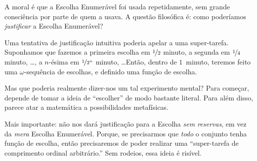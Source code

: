 \documentclass[../../../include/open-logic-section]{subfiles}
\begin{document}
A moral é que a Escolha Enumerável foi usada repetidamente, sem grande
consciência por parte de quem a usava. A questão filosófica é: como poderíamos
\emph{justificar} a Escolha Enumerável? 

Uma tentativa de justificação intuitiva poderia apelar a uma
super-tarefa. Suponhamos que fazemos a primeira escolha em $\nicefrac{1}{2}$ minuto, a segunda em $\nicefrac{1}{4}$ minuto, \dots, a
$n$-ésima em $\nicefrac{1}{2^n}$ minuto, \dots\@ Então, dentro de $1$~minuto, teremos feito uma $\omega$-sequência de escolhas, e definido
uma função de escolha. 

Mas que poderia realmente dizer-nos um tal experimento mental? Para
começar, depende de tomar a ideia de ``escolher'' de modo bastante
literal. Para além disso, parece atar a matemática a possibilidades metafísicas.

Mais importante: não nos dará justificação para a Escolha \emph{sem reservas}, em vez da \emph{mera} Escolha Enumerável.
Porque, se precisarmos que \emph{todo} o conjunto tenha função de escolha, então precisaremos de poder realizar uma ``super-tarefa de comprimento ordinal
arbitrário.'' Sem rodeios, essa ideia é risível.
\end{document}
